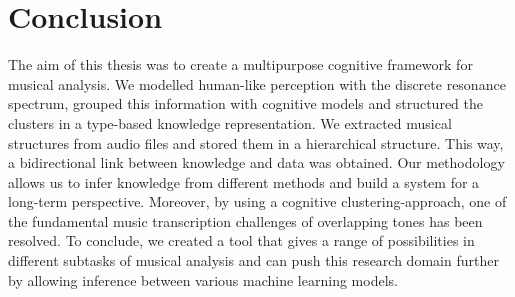 \chapter*{Conclusion}
\label{ch:conclusion}


The aim of this thesis was to create a multipurpose cognitive framework for musical analysis. 
We modelled human-like perception with the discrete resonance spectrum, grouped this information with cognitive models and structured the clusters in a type-based knowledge representation.
We extracted musical structures from audio files and stored them in a hierarchical structure. This way, a bidirectional link between knowledge and data was obtained.
Our methodology allows us to infer knowledge from different methods and build a system for a long-term perspective. 
Moreover, by using a cognitive clustering-approach, one of the fundamental music transcription challenges of overlapping tones has been resolved.
To conclude, we created a tool that gives a range of possibilities in different subtasks of musical analysis and can push this research domain further by allowing inference between various machine learning models.